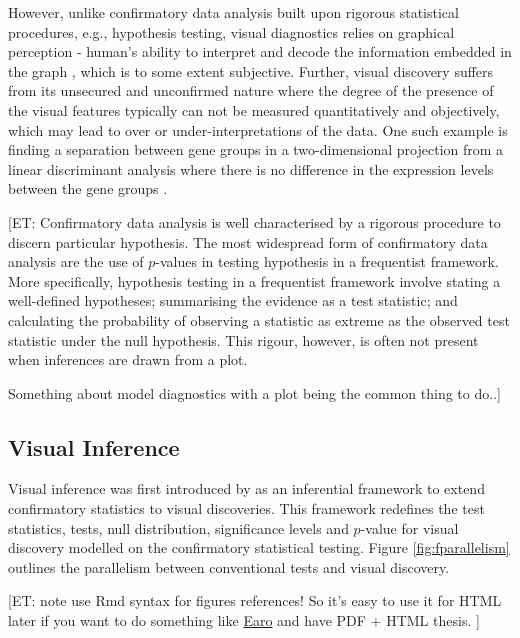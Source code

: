 \documentclass{monashthesis}
\begin{document}
However, unlike confirmatory data analysis built upon rigorous statistical procedures, e.g., hypothesis testing, visual diagnostics relies on graphical perception - human's ability to interpret and decode the information embedded in the graph \autocite{cleveland_graphical_1984}, which is to some extent subjective. Further, visual discovery suffers from its unsecured and unconfirmed nature where the degree of the presence of the visual features typically can not be measured quantitatively and objectively, which may lead to over or under-interpretations of the data. One such example is finding a separation between gene groups in a two-dimensional projection from a linear discriminant analysis where there is no difference in the expression levels between the gene groups \autocite{roy_chowdhury_using_2015}.

{[}ET: Confirmatory data analysis is well characterised by a rigorous procedure to discern particular hypothesis. The most widespread form of confirmatory data analysis are the use of \(p\)-values in testing hypothesis in a frequentist framework. More specifically, hypothesis testing in a frequentist framework involve stating a well-defined hypotheses; summarising the evidence as a test statistic; and calculating the probability of observing a statistic as extreme as the observed test statistic under the null hypothesis. This rigour, however, is often not present when inferences are drawn from a plot.

Something about model diagnostics with a plot being the common thing to do..{]}

\hypertarget{visual-inference-1}{%
\subsection{Visual Inference}\label{visual-inference-1}}

Visual inference was first introduced by \textcite{buja_statistical_2009} as an inferential framework to extend confirmatory statistics to visual discoveries. This framework redefines the test statistics, tests, null distribution, significance levels and \(p\)-value for visual discovery modelled on the confirmatory statistical testing. Figure \ref{fig:fparallelism} outlines the parallelism between conventional tests and visual discovery.

{[}ET: note use Rmd syntax for figures references! So it's easy to use it for HTML later if you want to do something like \href{https://github.com/earowang/thesis}{Earo} and have PDF + HTML thesis. {]}
\end{document}
